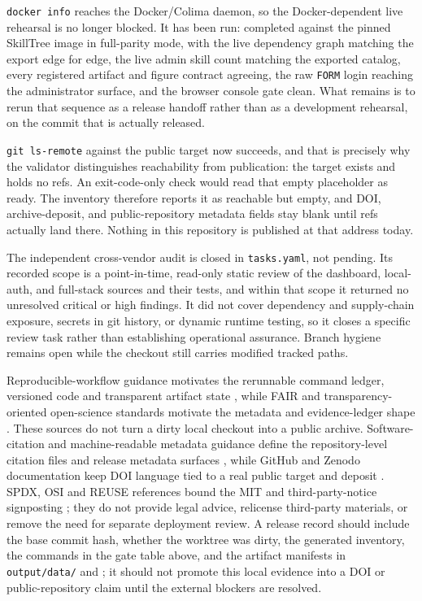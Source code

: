 \documentclass[
  english,
]{article}
\begin{document}
\texttt{docker\ info} reaches the Docker/Colima daemon, so the
Docker-dependent live rehearsal is no longer blocked. It has been run:
 completed
against the pinned SkillTree image in full-parity mode, with the live
dependency graph matching the export edge for edge, the live admin skill
count matching the exported catalog, every registered artifact and
figure contract agreeing, the raw \texttt{FORM} login reaching the
administrator surface, and the browser console gate clean. What remains
is to rerun that sequence as a release handoff rather than as a
development rehearsal, on the commit that is actually released.

\texttt{git\ ls-remote} against the public
 target now
succeeds, and that is precisely why the validator distinguishes
reachability from publication: the target exists and holds no refs. An
exit-code-only check would read that empty placeholder as ready. The
inventory therefore reports it as reachable but empty, and DOI,
archive-deposit, and public-repository metadata fields stay blank until
refs actually land there. Nothing in this repository is published at
that address today.

The independent cross-vendor audit is closed in \texttt{tasks.yaml}, not
pending. Its recorded scope is a point-in-time, read-only static review
of the dashboard, local-auth, and full-stack sources and their tests,
and within that scope it returned no unresolved critical or high
findings. It did not cover dependency and supply-chain exposure, secrets
in git history, or dynamic runtime testing, so it closes a specific
review task rather than establishing operational assurance. Branch
hygiene remains open while the checkout still carries modified tracked
paths.

Reproducible-workflow guidance motivates the rerunnable command ledger,
versioned code and transparent artifact state
\citep{sandve2013reproducible, wilson2014scientific_computing}, while
FAIR and transparency-oriented open-science standards motivate the
metadata and evidence-ledger shape
\citep{wilkinson2016fair, nosek2015top, munafo2017reproducible_science}.
These sources do not turn a dirty local checkout into a public archive.
Software-citation and machine-readable metadata guidance define the
repository-level citation files and release metadata surfaces
\citep{smith2016softwarecitation, citationfileformat2026, codemeta2026schema},
while GitHub and Zenodo documentation keep DOI language tied to a real
public target and deposit
\citep{github2026citingcontent, zenodo2026github}. SPDX, OSI and REUSE
references bound the MIT and third-party-notice signposting
\citep{spdx2026mit, opensourceinitiative2026mit, reuse2024spec}; they do
not provide legal advice, relicense third-party materials, or remove the
need for separate deployment review. A release record should include the
base commit hash, whether the worktree was dirty, the generated
inventory, the commands in the gate table above, and the artifact
manifests in \texttt{output/data/} and
; it should not promote this
local evidence into a DOI or public-repository claim until the external
blockers are resolved.
\end{document}
